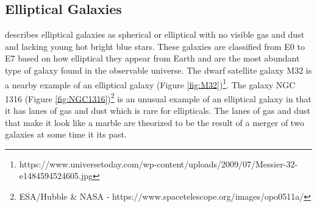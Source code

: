 \documentclass[12pt, oneside]{smuthesis}
\begin{document}
\subsection{\sc Elliptical Galaxies} \label{ellipticalGalaxies}

\cite{sag} describes elliptical galaxies as spherical or elliptical with no visible gas and dust and lacking young hot bright blue stars. These galaxies are classified from E0 to E7 based on how elliptical they appear from Earth and are the most abundant type of galaxy found in the observable universe. The dwarf satellite galaxy M32 is a nearby example of an elliptical galaxy (Figure \ref{fig:M32})\footnote{https://www.universetoday.com/wp-content/uploads/2009/07/Messier-32-e1484594524605.jpg}. The galaxy NGC 1316 (Figure \ref{fig:NGC1316})\footnote{ESA/Hubble \& NASA - https://www.spacetelescope.org/images/opo0511a/} is an unusual example of an elliptical galaxy in that it has lanes of gas and dust which is rare for ellipticals. The lanes of gas and dust that make it look like a marble are theorized to be the result of a merger of two galaxies at some time it its past.
\end{document}
